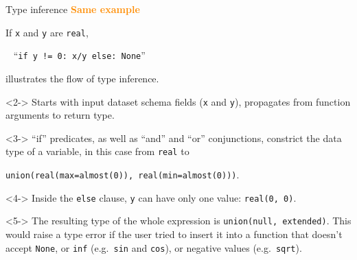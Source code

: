 \documentclass{beamer}
\begin{document}
\begin{frame}{Type inference}
\vspace{0.3 cm}
\textcolor{darkorange}{\bf Same example}

If {\tt x} and {\tt y} are {\tt real},

\vspace{0.2 cm}
\mbox{ } \hfill ``{\tt if y != 0:\ x/y else:\ None}'' \hfill \mbox{ }

\vspace{0.2 cm}
illustrates the flow of type inference.

\vspace{0.3 cm}
\begin{uncoverenv}<2->
Starts with input dataset schema fields ({\tt x} and {\tt y}), propagates from function arguments to return type.
\end{uncoverenv}

\vspace{0.3 cm}
\begin{uncoverenv}<3->
``if'' predicates, as well as ``and'' and ``or'' conjunctions, constrict the data type of a variable, in this case from {\tt real} to

\mbox{\tt union(real(max=almost(0)), real(min=almost(0)))}.
\end{uncoverenv}

\begin{uncoverenv}<4->
\vspace{-0.2 cm}
Inside the {\tt else} clause, {\tt y} can have only one value: {\tt real(0, 0)}.
\end{uncoverenv}

\begin{uncoverenv}<5->
\vspace{-0.2 cm}
The resulting type of the whole expression is {\tt union(null, extended)}. This would raise a type error if the user tried to insert it into a function that doesn't accept {\tt None}, or {\tt inf} (e.g.\ {\tt sin} and {\tt cos}), or negative values (e.g.\ {\tt sqrt}).
\end{uncoverenv}
\end{frame}
\end{document}
